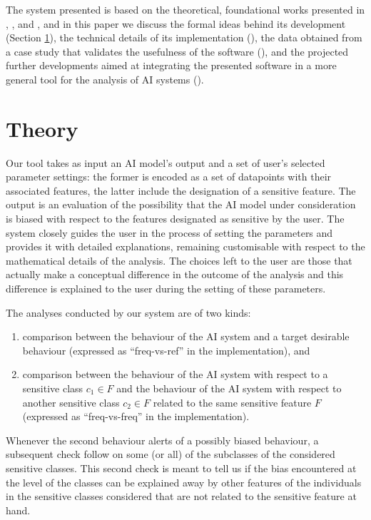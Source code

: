 \documentclass[
]{ceurart}
\begin{document}
The system presented is based on the theoretical, foundational works presented in \cite{dap21}, \cite{dagp22}, and \cite{gp23}, and in this paper we discuss the formal ideas behind its development (Section \ref{sec:theory}), the technical details of its implementation  (), the data obtained from a case study that validates the usefulness of the software (), and the projected further developments aimed at integrating the presented software in a more general tool for the analysis of AI systems ().

\section{Theory}\label{sec:theory}

Our tool takes as input an AI model's output and a set of user's selected parameter settings: the former is encoded as a set of datapoints with their associated features, the latter include the designation of a sensitive feature. The output is an evaluation of the possibility that the AI model under consideration is biased with respect to the features designated as sensitive by the user. The system closely guides the user in the process of setting the parameters and provides it with detailed explanations, remaining customisable with respect to the mathematical details of the analysis. The choices left to the user are those that actually make a conceptual difference in the outcome of the analysis and this difference is explained to the user during the setting of these parameters.

The analyses conducted by our system are of two kinds: 

\begin{enumerate}
	\item comparison between the behaviour of the AI system and a target desirable behaviour (expressed as ``freq-vs-ref'' in the implementation), and
	
	\item comparison between the behaviour of the AI system with respect to a sensitive class $c_1\in F$ and the behaviour of the AI system with respect to another sensitive class $c_2\in F$ related to the same sensitive feature $F$ (expressed as ``freq-vs-freq'' in the implementation).
\end{enumerate}

Whenever the second behaviour alerts of a possibly biased behaviour, a subsequent check follow on some (or all) of the subclasses of the considered sensitive classes. This second check is meant to tell us if the bias encountered at the level of the classes can be explained away by other features of the individuals in the sensitive classes considered that are not related to the sensitive feature at hand.
\end{document}
